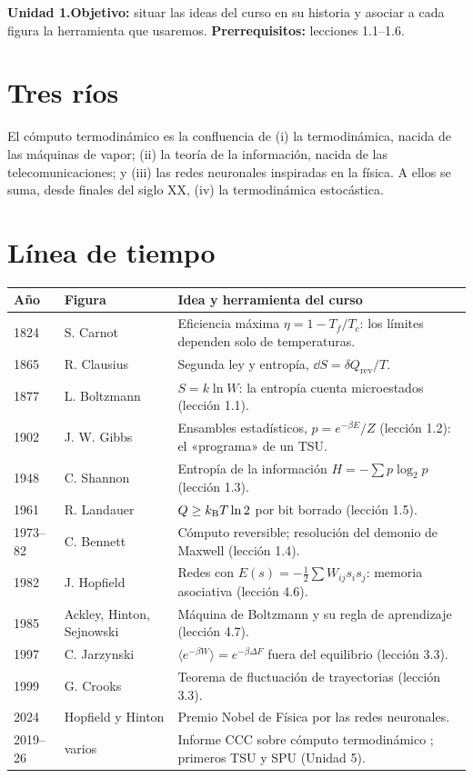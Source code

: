 \documentclass[11pt,a4paper]{article}
\begin{document}

\noindent\textbf{Unidad 1.}\quad\textbf{Objetivo:} situar las ideas del curso en su historia y asociar a cada figura
la herramienta que usaremos. \textbf{Prerrequisitos:} lecciones 1.1--1.6.

\section{Tres ríos}
El cómputo termodinámico es la confluencia de (i) la termodinámica, nacida de las máquinas de vapor; (ii) la teoría de
la información, nacida de las telecomunicaciones; y (iii) las redes neuronales inspiradas en la física. A ellos se suma,
desde finales del siglo XX, (iv) la termodinámica estocástica.

\section{Línea de tiempo}
\begin{center}\small
\begin{tabularx}{\linewidth}{llX}\toprule
Año & Figura & Idea y herramienta del curso\\\midrule
1824 & S. Carnot & Eficiencia máxima $\eta=1-T_f/T_c$: los límites dependen solo de temperaturas.\\
1865 & R. Clausius & Segunda ley y entropía, $\dd S=\delta Q_{\text{rev}}/T$.\\
1877 & L. Boltzmann & $S=k\ln W$: la entropía cuenta microestados (lección 1.1).\\
1902 & J. W. Gibbs & Ensambles estadísticos, $p=e^{-\beta E}/Z$ (lección 1.2): el «programa» de un TSU.\\
1948 & C. Shannon & Entropía de la información $H=-\sum p\log_2p$ (lección 1.3).\\
1961 & R. Landauer & $Q\ge k_{\mathrm B} T\ln2$ por bit borrado \cite{landauer} (lección 1.5).\\
1973--82 & C. Bennett & Cómputo reversible; resolución del demonio de Maxwell \cite{bennett} (lección 1.4).\\
1982 & J. Hopfield & Redes con $E(s)=-\frac12\sum W_{ij}s_is_j$: memoria asociativa \cite{hopfield} (lección 4.6).\\
1985 & Ackley, Hinton, Sejnowski & Máquina de Boltzmann y su regla de aprendizaje \cite{ackley} (lección 4.7).\\
1997 & C. Jarzynski & $\langle e^{-\beta W}\rangle=e^{-\beta\Delta F}$ fuera del equilibrio \cite{jarzynski} (lección 3.3).\\
1999 & G. Crooks & Teorema de fluctuación de trayectorias (lección 3.3).\\
2024 & Hopfield y Hinton & Premio Nobel de Física por las redes neuronales.\\
2019--26 & varios & Informe CCC sobre cómputo termodinámico \cite{conte}; primeros TSU y SPU (Unidad 5).\\\bottomrule
\end{tabularx}
\end{center}
\end{document}
